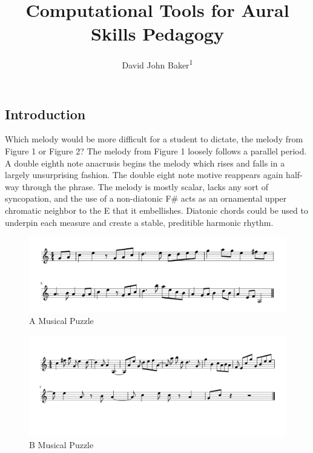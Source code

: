 \documentclass[english,man,floatsintext]{apa6}
\author{David John Baker\textsuperscript{1}}
\affiliation{
\vspace{0.5cm}
\textsuperscript{1} Louisiana State University}
\title{Computational Tools for Aural Skills Pedagogy}
\date{}
\begin{document}
\maketitle

\hypertarget{introduction}{%
\subsection{Introduction}\label{introduction}}

Which melody would be more difficult for a student to dictate, the melody from Figure 1 or Figure 2?
The melody from Figure 1 loosely follows a parallel period.
A double eighth note anacrusis begins the melody which rises and falls in a largely unsurprising fashion.
The double eight note motive reappears again half-way through the phrase.
The melody is mostly scalar, lacks any sort of syncopation, and the use of a non-diatonic F\# acts as an ornamental upper chromatic neighbor to the E that it embellishes.
Diatonic chords could be used to underpin each measure and create a stable, preditible harmonic rhythm.

\begin{figure}
\includegraphics[width=1\linewidth]{../figures/musical_puzzles/musical_puzzle_a} \caption{A Musical Puzzle}\label{fig:puza}
\end{figure}

\begin{figure}
\includegraphics[width=1\linewidth]{../figures/musical_puzzles/musical_puzzle_b} \caption{B Musical Puzzle}\label{fig:puzb}
\end{figure}
\end{document}
